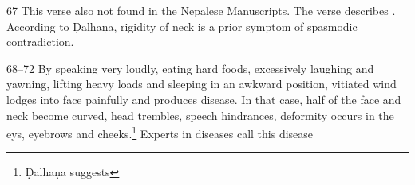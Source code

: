\begin{translation}
\item[67] This verse also not found in the Nepalese Manuscripts. The verse describes . According to Ḍalhaṇa, rigidity of neck is a prior symptom of spasmodic contradiction. 

\item[68--72] By speaking very loudly, eating hard foods, excessively laughing and yawning, lifting heavy loads and sleeping in an awkward position, vitiated wind lodges into face painfully and produces  disease. In that case, half of the face and neck become curved, head trembles, speech hindrances, deformity occurs in the eys, eyebrows and cheeks.\footnote{Ḍalhaṇa suggests } Experts in diseases call this disease  




















 




\end{translation}